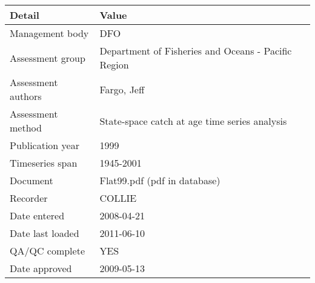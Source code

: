\begin{table}[htb]
\centering
\begin{tabular}{lp{7cm}}
\toprule
Detail & Value \\
\midrule
Management body    & DFO                                                 \\
Assessment group   & Department of Fisheries and Oceans - Pacific Region \\
Assessment authors & Fargo, Jeff                                         \\
Assessment method  & State-space catch at age time series analysis       \\
Publication year   & 1999                                                \\
Timeseries span    & 1945-2001                                           \\
Document           & Flat99.pdf (pdf in database)                        \\
Recorder           & COLLIE                                              \\
Date entered       & 2008-04-21                                          \\
Date last loaded   & 2011-06-10                                          \\
QA/QC complete     & YES                                                 \\
Date approved      & 2009-05-13                                          \\
\bottomrule
\end{tabular}
\label{tab:assessdet}
\end{table}
